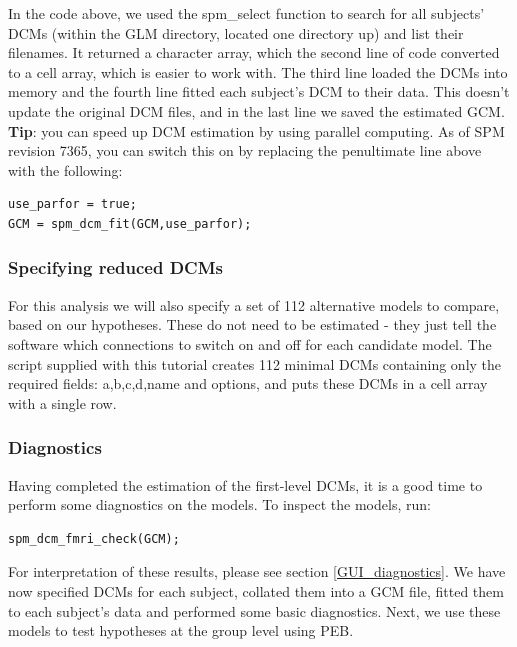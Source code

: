 \documentclass{article}
\begin{document}
In the code above, we used the spm\_select function to search for all subjects' DCMs (within the GLM directory, located one directory up) and list their filenames. It returned a character array, which the second line of code converted to a cell array, which is easier to work with. The third line loaded the DCMs into memory and the fourth line fitted each subject's DCM to their data. This doesn't update the original DCM files, and in the last line we saved the estimated GCM. \\

\textbf{Tip}: you can speed up DCM estimation by using parallel computing. As of SPM revision 7365, you can switch this on by replacing the penultimate line above with the following:

\begin{lstlisting}[style=Matlab-editor, caption=Enabling parallel DCM estimation]
use_parfor = true;
GCM = spm_dcm_fit(GCM,use_parfor);

\end{lstlisting}

\subsubsection{Specifying reduced DCMs}
For this analysis we will also specify a set of 112 alternative models to compare, based on our hypotheses. These do not need to be estimated - they just tell the software which connections to switch on and off for each candidate model. The script supplied with this tutorial creates 112 minimal DCMs containing only the required fields: a,b,c,d,name and options, and puts these DCMs in a cell array with a single row.

\subsubsection{Diagnostics}
Having completed the estimation of the first-level DCMs, it is a good time to perform some diagnostics on the models. To inspect the models, run:

\begin{lstlisting}[style=Matlab-editor, caption=DCM for fMRI diagnostics]
spm_dcm_fmri_check(GCM);
\end{lstlisting}

For interpretation of these results, please see section \ref{GUI_diagnostics}. We have now specified DCMs for each subject, collated them into a GCM file, fitted them to each subject's data and performed some basic diagnostics. Next, we use these models to test hypotheses at the group level using PEB.
\end{document}
